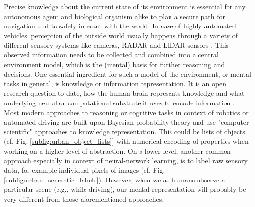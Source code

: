 Precise knowledge about the current state of its environment is essential for any autonomous agent and biological organism alike to plan a secure path for navigation and to safely interact with the world.
In case of highly automated vehicles, perception of the outside world usually happens through a variety of different sensory systems like cameras, \acs{RADAR} and \acs{LIDAR} sensors \citep{Aeberhard2015}.
This observed information needs to be collected and combined into a central environment model, which is the (mental) basis for further reasoning and decisions.
One essential ingredient for such a model of the environment, or mental tasks in general, is knowledge or information representation.
It is an open research question to date, how the human brain represents knowledge and what underlying neural or computational substrate it uses to encode information \citep{Wang2003, Samsonovich2012, Handjaras2016}.
Most modern approaches to reasoning or cognitive tasks in context of robotics or automated driving are built upon Bayesian probability theory and use "computer-scientific" approaches to knowledge representation.
This could be lists of objects (cf. Fig. \ref{subfig:urban_object_lists}) with numerical encoding of properties when working on a higher level of abstraction.
On a lower level, another common approach especially in context of neural-network learning, is to label raw sensory data, for example individual pixels of images (cf. Fig. \ref{subfig:urban_semantic_labels}).
However, when we as humans observe a particular scene (e.g., while driving), our mental representation will probably be very different from those aforementioned approaches.
